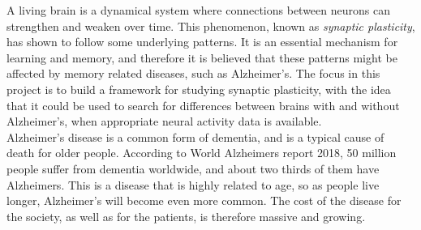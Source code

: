 


A living brain is a dynamical system where connections between neurons can strengthen and weaken over time. This phenomenon, known as \textit{synaptic plasticity}, has shown to follow some underlying patterns. It is an essential mechanism for learning and memory, and therefore it is believed that these patterns might be affected by memory related diseases, such as Alzheimer's. The focus in this project is to build a framework for studying synaptic plasticity, with the idea that it could be used to search for differences between brains with and without Alzheimer's, when appropriate neural activity data is available.  \\

Alzheimer's disease is a common form of dementia, and is a typical cause of death for older people. According to World Alzheimers report 2018, 50 million people suffer from dementia worldwide, and about two thirds of them have Alzheimers. This is a disease that is highly related to age, so as people live longer, Alzheimer’s will become even more common. The cost of the disease for the society, as well as for the patients, is therefore massive and growing.

